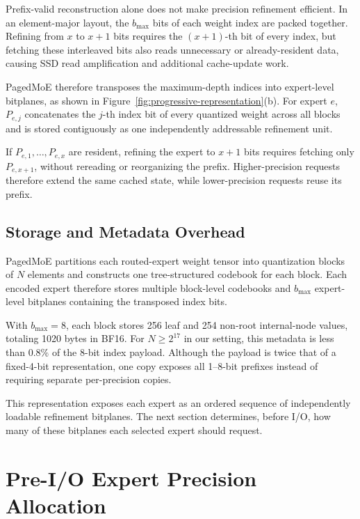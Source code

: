 \documentclass[sigconf, nonacm]{acmart}
\begin{document}
Prefix-valid reconstruction alone does not make precision refinement
efficient. In an element-major layout, the \(b_{\max}\) bits of each weight index are packed
together. Refining from \(x\) to \(x+1\) bits requires the \((x+1)\)-th bit
of every index, but fetching these interleaved bits also reads unnecessary
or already-resident data, causing SSD read amplification and additional
cache-update work.

PagedMoE therefore transposes the maximum-depth indices into expert-level
bitplanes, as shown in Figure~\ref{fig:progressive-representation}(b). For expert \(e\),
\(P_{e,j}\) concatenates the \(j\)-th index bit of every quantized weight
across all blocks and is stored contiguously as one independently addressable
refinement unit.

If \(P_{e,1},\ldots,P_{e,x}\) are resident, refining the expert to
\(x+1\) bits requires fetching only \(P_{e,x+1}\), without rereading or
reorganizing the prefix. Higher-precision requests therefore extend the same
cached state, while lower-precision requests reuse its prefix.

\subsection{Storage and Metadata Overhead}

PagedMoE partitions each routed-expert weight tensor into quantization blocks of
\(N\) elements and constructs one tree-structured codebook for each block. Each encoded expert therefore stores multiple block-level codebooks
and \(b_{\max}\) expert-level bitplanes containing the transposed index bits.

With \(b_{\max}=8\), each block stores 256 leaf and 254 non-root internal-node
values, totaling 1020 bytes in BF16. For \(N\geq2^{17}\) in our setting, this metadata is
less than \(0.8\%\) of the 8-bit index payload. Although the payload is twice
that of a fixed-4-bit representation, one copy exposes all 1--8-bit prefixes
instead of requiring separate per-precision copies.

This representation exposes each expert as an ordered sequence of
independently loadable refinement bitplanes. The next section determines, before I/O,
how many of these bitplanes each selected expert should request.

\section{Pre-I/O Expert Precision Allocation}
\label{sec:precision-allocation}
\end{document}
